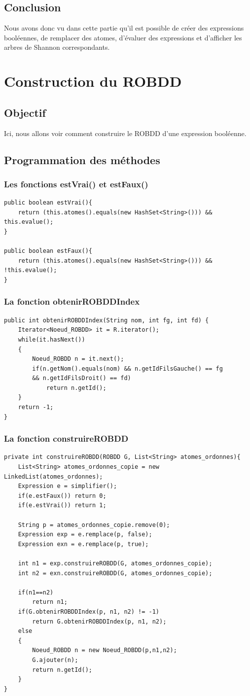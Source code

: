 \documentclass{article}
\begin{document}
\subsection{Conclusion}
Nous avons donc vu dans cette partie qu'il est possible de créer des expressions booléennes, de remplacer des atomes, d'évaluer des expressions et d'afficher les arbres de Shannon correspondants. 
\section{Construction du ROBDD}
\subsection{Objectif}
Ici, nous allons voir comment construire le ROBDD d'une expression booléenne.
\subsection{Programmation des méthodes}
\subsubsection{Les fonctions estVrai() et estFaux()}
\begin{verbatim}
public boolean estVrai(){
	return (this.atomes().equals(new HashSet<String>())) && this.evalue();
}

public boolean estFaux(){
	return (this.atomes().equals(new HashSet<String>())) && !this.evalue();
}
\end{verbatim}
\subsubsection{La fonction obtenirROBDDIndex}
\begin{verbatim}
public int obtenirROBDDIndex(String nom, int fg, int fd) {
	Iterator<Noeud_ROBDD> it = R.iterator();
	while(it.hasNext())
	{
		Noeud_ROBDD n = it.next();
		if(n.getNom().equals(nom) && n.getIdFilsGauche() == fg 
		&& n.getIdFilsDroit() == fd)
			return n.getId();
	}
	return -1;
}
\end{verbatim}
\subsubsection{La fonction construireROBDD}
\begin{verbatim}
private int construireROBDD(ROBDD G, List<String> atomes_ordonnes){
	List<String> atomes_ordonnes_copie = new LinkedList(atomes_ordonnes);
	Expression e = simplifier();
	if(e.estFaux()) return 0;
	if(e.estVrai()) return 1;
	
	String p = atomes_ordonnes_copie.remove(0);
	Expression exp = e.remplace(p, false);
	Expression exn = e.remplace(p, true);
	
	int n1 = exp.construireROBDD(G, atomes_ordonnes_copie);
	int n2 = exn.construireROBDD(G, atomes_ordonnes_copie);
	
	if(n1==n2)
		return n1;
	if(G.obtenirROBDDIndex(p, n1, n2) != -1)
		return G.obtenirROBDDIndex(p, n1, n2);
	else
	{
		Noeud_ROBDD n = new Noeud_ROBDD(p,n1,n2);
		G.ajouter(n);
		return n.getId();
	}
}
\end{verbatim}
\end{document}
